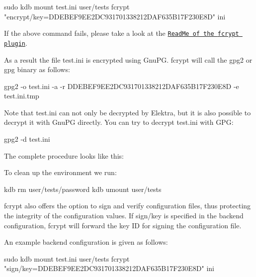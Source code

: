 \begin{DoxyCode}
sudo kdb mount test.ini user/tests fcrypt "encrypt/key=DDEBEF9EE2DC931701338212DAF635B17F230E8D" ini
\end{DoxyCode}


If the above command fails, please take a look at the \href{https://master.libelektra.org/src/plugins/fcrypt/README.md#known-issues}{\tt Read\+Me of the {\ttfamily fcrypt} plugin}.

As a result the file {\ttfamily test.\+ini} is encrypted using Gnu\+PG. {\ttfamily fcrypt} will call the {\ttfamily gpg2} or {\ttfamily gpg} binary as follows\+:


\begin{DoxyCode}
gpg2 -o test.ini -a -r DDEBEF9EE2DC931701338212DAF635B17F230E8D -e test.ini.tmp
\end{DoxyCode}


Note that {\ttfamily test.\+ini} can not only be decrypted by Elektra, but it is also possible to decrypt it with Gnu\+PG directly. You can try to decrypt {\ttfamily test.\+ini} with G\+PG\+:


\begin{DoxyCode}
gpg2 -d test.ini
\end{DoxyCode}


The complete procedure looks like this\+:




To clean up the environment we run\+:


\begin{DoxyCode}
kdb rm user/tests/password
kdb umount user/tests
\end{DoxyCode}


{\ttfamily fcrypt} also offers the option to sign and verify configuration files, thus protecting the integrity of the configuration values. If {\ttfamily sign/key} is specified in the backend configuration, {\ttfamily fcrypt} will forward the key ID for signing the configuration file.

An example backend configuration is given as follows\+:


\begin{DoxyCode}
sudo kdb mount test.ini user/tests fcrypt "sign/key=DDEBEF9EE2DC931701338212DAF635B17F230E8D" ini
\end{DoxyCode}


